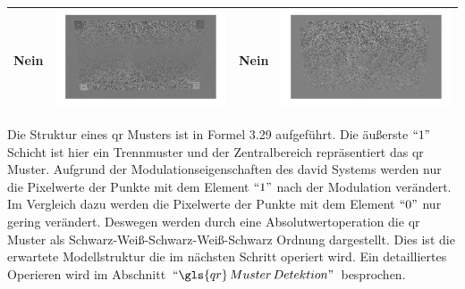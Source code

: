 \begin{table}[htb]
\begin{tabular}{|p{2cm}<{\centering}|c|p{2cm}<{\centering}|c|}
	Nein & \includegraphics[scale=0.15]{images/3_Ersteverfahren/Differenzbild/4halbschwaryhalbweis.pdf}& Nein & \includegraphics[scale=0.15]{images/3_Ersteverfahren/Differenzbild/5aufheben.pdf}\\

	\bottomrule
	\end{tabular}
\end{table} 


Die Struktur eines \gls{qr} Musters ist in Formel 3.29 aufgeführt. Die äußerste $``1"$ Schicht ist hier ein Trennmuster und der Zentralbereich repräsentiert das \gls{qr} Muster. Aufgrund der Modulationseigenschaften des \gls{david} Systems werden nur die Pixelwerte der Punkte mit dem Element $``1"$ nach der Modulation verändert. Im Vergleich dazu werden die Pixelwerte der Punkte mit dem Element $``0"$ nur gering verändert. Deswegen werden durch eine Absolutwertoperation die \gls{qr} Muster als Schwarz-Weiß-Schwarz-Weiß-Schwarz Ordnung dargestellt. Dies ist die erwartete Modellstruktur die im nächsten Schritt operiert wird. Ein detailliertes Operieren wird im Abschnitt $ ``\gls{qr}\,Muster\,Detektion" $ besprochen.

